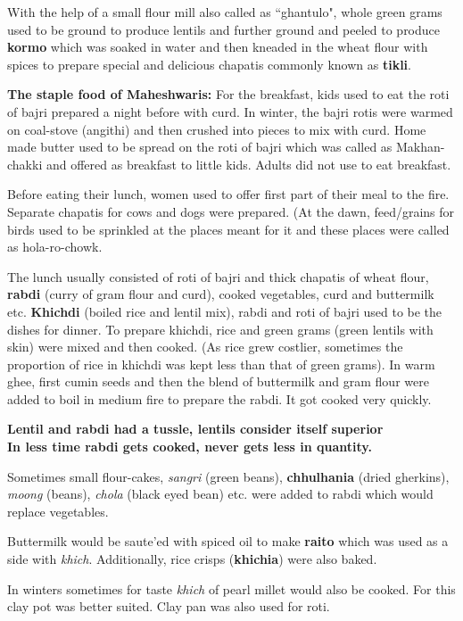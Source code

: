 With the help of a small flour mill also called as ``ghantulo", whole green
grams used to be ground to produce lentils and further ground and peeled to
produce \textbf{kormo} which was soaked in water and then kneaded in the wheat
flour with spices to prepare special and delicious chapatis commonly known as
\textbf{tikli}.

\textbf{The staple food of Maheshwaris:} For the breakfast, kids used to eat the
roti of bajri prepared a night before with curd. In winter, the bajri rotis were
warmed on coal-stove (angithi) and then crushed into pieces to mix with curd.
Home made butter used to be spread on the roti of bajri which was called as
Makhan-chakki and offered as breakfast to little kids. Adults did not use to eat
breakfast.

Before eating their lunch, women used to offer first part of their meal to the
fire. Separate chapatis for cows and dogs were prepared. (At the dawn,
feed/grains for birds used to be sprinkled at the places meant for it and these
places were called as hola-ro-chowk.

The lunch usually consisted of roti of bajri and thick chapatis of wheat flour,
\textbf{rabdi} (curry of gram flour and curd), cooked vegetables, curd and
buttermilk etc. \textbf{Khichdi} (boiled rice and lentil mix), rabdi and roti of
bajri used to be the dishes for dinner. To prepare khichdi, rice and green
grams (green lentils with skin) were mixed and then cooked. (As rice grew
costlier, sometimes the proportion of rice in khichdi was kept less than that of
green grams). In warm ghee, first cumin seeds and then the blend of buttermilk
and gram flour were added to boil in medium fire to prepare the rabdi. It got
cooked very quickly.

\textbf{Lentil and rabdi had a tussle, lentils consider itself superior\\ In
less time rabdi gets cooked, never gets less in quantity.}

Sometimes small flour-cakes, \textit{sangri} (green beans), \textbf{chhulhania}
(dried gherkins), \textit{moong} (beans), \textit{chola} (black eyed bean) etc.
were added to rabdi which would replace vegetables.

Buttermilk would be saut{e}'ed with spiced oil to make \textbf{raito} which was
used as a side with \textit{khich}. Additionally, rice crisps
(\textbf{khichia}) were also baked.

In winters sometimes for taste \textit{khich} of pearl millet would also be cooked.
For this clay pot was better suited. Clay pan was also used for roti.

